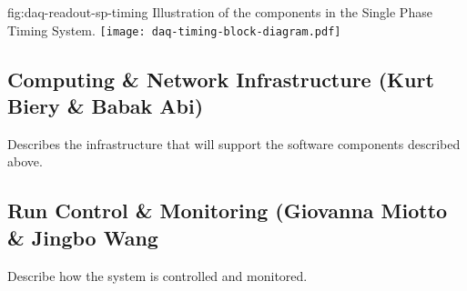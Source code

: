 \begin{dunefigure}{fig:daq-readout-sp-timing}
  {Illustration of the components in the Single Phase Timing System. }
\texttt{[image: daq-timing-block-diagram.pdf]}
\end{dunefigure}



\subsection{Computing \& Network Infrastructure (Kurt Biery \& Babak Abi)}
\label{sec:fdsp-daq-infra}

Describes the infrastructure that will support the software components described above.

\subsection{Run Control \& Monitoring (Giovanna Miotto \& Jingbo Wang}
\label{sec:fdsp-daq-tcm}

Describe how the system is controlled and monitored.

